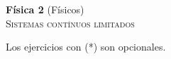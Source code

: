 \documentclass[11pt,spanish,a4paper]{article}
\begin{document}
\begin{center}
\textbf{Física 2} (Físicos) \hfill {}\\
	\textsc{\LARGE Sistemas contínuos limitados}
\end{center}

Los ejercicios con (*) son opcionales.

\begin{enumerate}






\end{enumerate}
\end{document}
